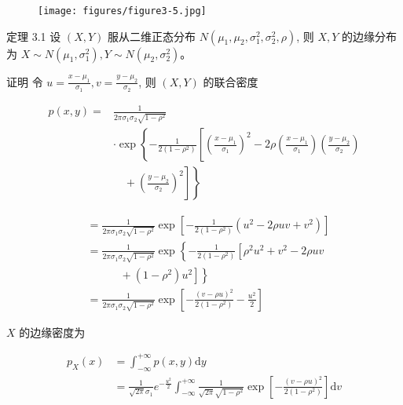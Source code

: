 \documentclass{beamer}
\begin{document}
	\begin{frame}
		\begin{figure}
			\centering
			\texttt{[image: figures/figure3-5.jpg]}
		\end{figure}
	\end{frame}
	
	\begin{frame}
		定理 3.1 设 $(X, Y)$ 服从二维正态分布 $N\left(\mu_{1}, \mu_{2}, \sigma_{1}^{2}, \sigma_{2}^{2}, \rho\right)$, 则 $X, Y$ 的边缘分布为 $X \sim N\left(\mu_{1}, \sigma_{1}^{2}\right), Y \sim N\left(\mu_{2}, \sigma_{2}^{2}\right) 。$
		
		\vspace*{1cm}
		证明 令 $u=\frac{x-\mu_{1}}{\sigma_{1}}, v=\frac{y-\mu_{2}}{\sigma_{2}}$, 则 $(X, Y)$ 的联合密度
		
		$$
		\begin{aligned}
			p(x, y)= & \frac{1}{2 \pi \sigma_{1} \sigma_{2} \sqrt{1-\rho^{2}}} \\
			& \cdot \exp \left\{-\frac{1}{2\left(1-\rho^{2}\right)}\left[\left(\frac{x-\mu_{1}}{\sigma_{1}}\right)^{2}-2 \rho\left(\frac{x-\mu_{1}}{\sigma_{1}}\right)\left(\frac{y-\mu_{2}}{\sigma_{2}}\right)\right.\right. \\
			&\quad + \left.\left.\left(\frac{y-\mu_{2}}{\sigma_{2}}\right)^{2}\right]\right\}
		\end{aligned}
		$$
	\end{frame}
	
	\begin{frame}
		$$
		\begin{aligned}
			& =\frac{1}{2 \pi \sigma_{1} \sigma_{2} \sqrt{1-\rho^{2}}} \exp \left[-\frac{1}{2\left(1-\rho^{2}\right)}\left(u^{2}-2 \rho u v+v^{2}\right)\right] \\
			& =\frac{1}{2 \pi \sigma_{1} \sigma_{2} \sqrt{1-\rho^{2}}} \exp \left\{-\frac{1}{2\left(1-\rho^{2}\right)}\left[\rho^{2} u^{2}+v^{2}-2 \rho u v
			\right.\right. \\
			& \quad\quad\quad +\left(1-\rho^{2}\right)
			\left.\left. u^{2}\right]\right\} \\
			& =\frac{1}{2 \pi \sigma_{1} \sigma_{2} \sqrt{1-\rho^{2}}} \exp \left[-\frac{(v-\rho u)^{2}}{2\left(1-\rho^{2}\right)}-\frac{u^{2}}{2}\right]
		\end{aligned}
		$$
		
		$X$ 的边缘密度为
		
		$$
		\begin{aligned}
			p_{X}(x) & =\int_{-\infty}^{+\infty} p(x, y) \mathrm{d} y \\
			& =\frac{1}{\sqrt{2 \pi} \sigma_{1}} e^{-\frac{u^{2}}{2}} \int_{-\infty}^{+\infty} \frac{1}{\sqrt{2 \pi} \sqrt{1-\rho^{2}}} \exp \left[-\frac{(v-\rho u)^{2}}{2\left(1-\rho^{2}\right)}\right] \mathrm{d} v
		\end{aligned}
		$$
	\end{frame}
	
\end{document}
